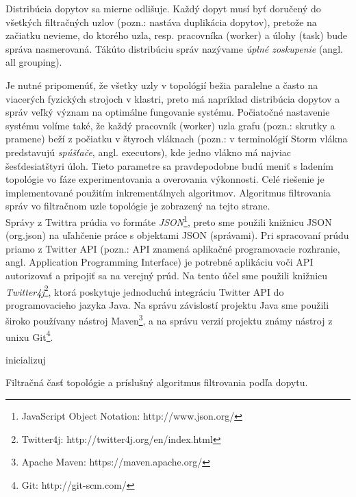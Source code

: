 Distribúcia dopytov sa mierne odlišuje. Každý dopyt musí byť doručený do všetkých filtračných uzlov (pozn.: nastáva duplikácia dopytov), pretože na začiatku nevieme, do ktorého uzla, resp. pracovníka (worker) a úlohy (task) bude správa nasmerovaná. Tákúto distribúciu správ nazývame \textit{úplné zoskupenie} (angl. all grouping).
{}\label{fig:impl-vseobecna} 

Je nutné pripomenúť, že všetky uzly v topológií bežia paralelne a často na viacerých fyzických strojoch v klastri, preto má napríklad distribúcia dopytov a správ veľký význam na optimálne fungovanie systému. Počiatočné nastavenie systému volíme také, že každý pracovník (worker) uzla grafu (pozn.: skrutky a pramene) beží z počiatku v štyroch vláknach (pozn.: v terminológií Storm vlákna predstavujú \textit{spúšťače}, angl. executors), kde jedno vlákno má najviac šesťdesiatštyri úloh. Tieto parametre sa pravdepodobne budú meniť s ladením topológie vo fáze experimentovania a overovania výkonnosti. Celé riešenie je implementované použitím inkrementálnych algoritmov. Algoritmus filtrovania správ vo filtračnom uzle topológie je zobrazený na tejto strane. 
\\[5pt]
Správy z Twittra prúdia vo formáte \textit{JSON}\footnote{JavaScript Object Notation: http://www.json.org/}, preto sme použili knižnicu JSON (org.json) na uľahčenie práce s objektami JSON (správami). Pri spracovaní prúdu priamo z Twitter API (pozn.: API znamená aplikačné programovacie rozhranie, angl. Application Programming Interface) je potrebné aplikáciu voči API autorizovať a pripojiť sa na verejný prúd. Na tento účel sme použili knižnicu \textit{Twitter4j}\footnote{Twitter4j: http://twitter4j.org/en/index.html}, ktorá poskytuje jednoduchú integráciu Twitter API do programovacieho jazyka Java. Na správu závislostí projektu Java sme použili široko používany nástroj Maven\footnote{Apache Maven: https://maven.apache.org/}, a na správu verzií projektu známy nástroj z unixu Git\footnote{Git: http://git-scm.com/}. 
\\[10pt]
\begin{algorithm}[H]
 inicializuj\;
 \caption{Filtračná časť topológie a príslušný algoritmus filtrovania podľa dopytu.}
\end{algorithm}

